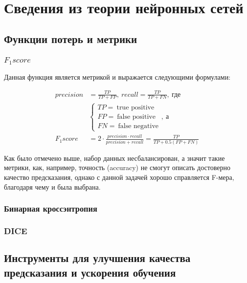 \chapter{Сведения из теории нейронных сетей}

\section{Функции потерь и метрики}
\subsection{$F_1score$}
Данная функция является метрикой и выражается следующими формулами:

\begin{align*}
	precision & = \frac{TP}{TP + FP}, \: recall = \frac{TP}{TP + FN}, \: \text{где}                        \\
	          & \begin{cases}
		            TP = \: \text{true positive}  \\
		            FP = \: \text{false positive} \\
		            FN = \: \text{false negative}
	            \end{cases}, \: \text{а}                                                              \\
	F_1score  & = 2 \cdot \frac{precision \cdot recall}{precision + recall} = \frac{TP}{TP + 0.5(FP + FN)}
\end{align*}

Как было отмечено выше, набор данных несбалансирован, а значит такие метрики, как,
например, точность (accuracy) не смогут описать достоверно качество
предсказания, однако с данной задачей хорошо справляется F-мера, благодаря чему
и была выбрана.

\subsection{Бинарная кроссэнтропия}

\subsection{DICE}

\section{Инструменты для улучшения качества предсказания и ускорения обучения}


